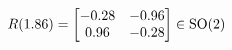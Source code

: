 \documentclass[preview]{standalone}
\begin{document}
\begin{align*}
\special{dvisvgm:raw <g id='unique000'>}R(1.86) = \begin{bmatrix} -0.28 & -0.96 \\ 0.96 & -0.28 \end{bmatrix} \in \text{SO}(2)\special{dvisvgm:raw </g>}
\end{align*}
\end{document}

